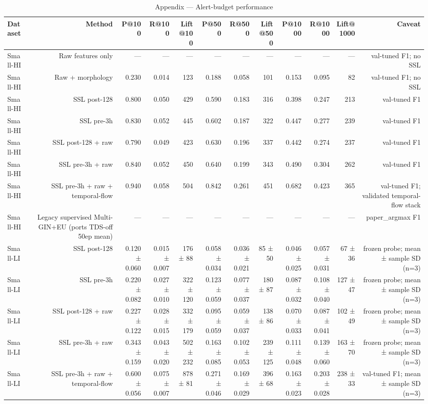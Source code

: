 \begin{table}[t]
\centering
\caption{Appendix — Alert-budget performance}
\begin{tabular}{lrrrrrrrrrrr}
\toprule
Dataset & Method & P@100 & R@100 & Lift@100 & P@500 & R@500 & Lift@500 & P@1000 & R@1000 & Lift@1000 & Caveat \\
\midrule
Small-HI & Raw features only & --- & --- & --- & --- & --- & --- & --- & --- & --- & val-tuned F1; no SSL \\
Small-HI & Raw + morphology & 0.230 & 0.014 & 123 & 0.188 & 0.058 & 101 & 0.153 & 0.095 & 82 & val-tuned F1; no SSL \\
Small-HI & SSL post-128 & 0.800 & 0.050 & 429 & 0.590 & 0.183 & 316 & 0.398 & 0.247 & 213 & val-tuned F1 \\
Small-HI & SSL pre-3h & 0.830 & 0.052 & 445 & 0.602 & 0.187 & 322 & 0.447 & 0.277 & 239 & val-tuned F1 \\
Small-HI & SSL post-128 + raw & 0.790 & 0.049 & 423 & 0.630 & 0.196 & 337 & 0.442 & 0.274 & 237 & val-tuned F1 \\
Small-HI & SSL pre-3h + raw & 0.840 & 0.052 & 450 & 0.640 & 0.199 & 343 & 0.490 & 0.304 & 262 & val-tuned F1 \\
Small-HI & SSL pre-3h + raw + temporal-flow & 0.940 & 0.058 & 504 & 0.842 & 0.261 & 451 & 0.682 & 0.423 & 365 & val-tuned F1; validated temporal-flow stack \\
Small-HI & Legacy supervised Multi-GIN+EU (ports TDS-off 50ep mean) & --- & --- & --- & --- & --- & --- & --- & --- & --- & paper\_argmax F1 \\
Small-LI & SSL post-128 & 0.120 ± 0.060 & 0.015 ± 0.007 & 176 ± 88 & 0.058 ± 0.034 & 0.036 ± 0.021 & 85 ± 50 & 0.046 ± 0.025 & 0.057 ± 0.031 & 67 ± 36 & frozen probe; mean ± sample SD (n=3) \\
Small-LI & SSL pre-3h & 0.220 ± 0.082 & 0.027 ± 0.010 & 322 ± 120 & 0.123 ± 0.059 & 0.077 ± 0.037 & 180 ± 87 & 0.087 ± 0.032 & 0.108 ± 0.040 & 127 ± 47 & frozen probe; mean ± sample SD (n=3) \\
Small-LI & SSL post-128 + raw & 0.227 ± 0.122 & 0.028 ± 0.015 & 332 ± 179 & 0.095 ± 0.059 & 0.059 ± 0.037 & 138 ± 86 & 0.070 ± 0.033 & 0.087 ± 0.041 & 102 ± 49 & frozen probe; mean ± sample SD (n=3) \\
Small-LI & SSL pre-3h + raw & 0.343 ± 0.159 & 0.043 ± 0.020 & 502 ± 232 & 0.163 ± 0.085 & 0.102 ± 0.053 & 239 ± 125 & 0.111 ± 0.048 & 0.139 ± 0.060 & 163 ± 70 & frozen probe; mean ± sample SD (n=3) \\
Small-LI & SSL pre-3h + raw + temporal-flow & 0.600 ± 0.056 & 0.075 ± 0.007 & 878 ± 81 & 0.271 ± 0.046 & 0.169 ± 0.029 & 396 ± 68 & 0.163 ± 0.023 & 0.203 ± 0.028 & 238 ± 33 & val-tuned F1; mean ± sample SD (n=3) \\

\end{tabular}
\end{table}
